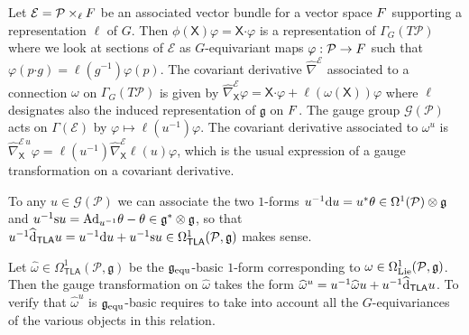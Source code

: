 \documentclass[number]{elsarticle}
\theoremstyle{definition}
\theoremstyle{remark}
\numberwithin{equation}{section}
\begin{document}
Let ${{{{\mathcal{{E}}}}}} = {{{{\mathcal{{P}}}}}} \times_{\ell} {{{{\mathnormal{{F}}}}}}$ be an associated vector bundle for a vector space ${{{{\mathnormal{{F}}}}}}$ supporting a representation $\ell$ of $G$. Then $\phi({{\mathsf X}})\varphi = {{\mathsf X}}{\mathord{\cdot}} \varphi$ is a representation of $\Gamma_G(T{{{{\mathcal{{P}}}}}})$ where we look at sections of ${{{{\mathcal{{E}}}}}}$ as $G$-equivariant maps $\varphi: {{{{\mathcal{{P}}}}}} \rightarrow {{{{\mathnormal{{F}}}}}}$ such that $\varphi(p{\mathord{\cdot}} g) = \ell(g^{-1}) \varphi(p)$. The covariant derivative ${{\widehat{\nabla}}}^{{{{\mathcal{{E}}}}}}$ associated to a connection $\omega$ on $\Gamma_G(T{{{{\mathcal{{P}}}}}})$ is given by ${{\widehat{\nabla}}}^{{{{\mathcal{{E}}}}}}_{{\mathsf X}} \varphi = {{\mathsf X}} {\mathord{\cdot}} \varphi + \ell(\omega({{\mathsf X}})) \varphi$ where $\ell$ designates also the induced representation of ${{\mathfrak g}}$ on ${{{{\mathnormal{{F}}}}}}$. The gauge group ${{\mathcal G}}({{{{\mathcal{{P}}}}}})$ acts on $\Gamma({{{{\mathcal{{E}}}}}})$ by $\varphi \mapsto \ell(u^{-1}) \varphi$. The covariant derivative associated to $\omega^u$ is ${{\widehat{\nabla}}}^{{{{{\mathcal{{E}}}}}}\, u}_{{\mathsf X}} \varphi  = \ell(u^{-1}) {{\widehat{\nabla}}}^{{{{\mathcal{{E}}}}}}_{{\mathsf X}} \ell(u) \varphi$, which is the usual expression of a gauge transformation on a covariant derivative.

To any $u \in {{\mathcal G}}({{{{\mathcal{{P}}}}}})$ we can associate the two $1$-forms $u^{-1} {\text{\textup{d}}} u = u^\ast \theta \in \Omega^1({{{{\mathcal{{P}}}}}})\otimes {{\mathfrak g}}$ and $u^{-1} {\text{\textup{s}}} u = {{\text{\textup{Ad}}}}_{u^{-1}} \theta - \theta \in {{\mathfrak g}}^{\ast} \otimes {{\mathfrak g}}$, so that $u^{-1} {\widehat{\text{\textup{d}}}}_{{{{\mathbf{\mathsf{{TLA}}}}}}} u =  u^{-1}{\text{\textup{d}}} u + u^{-1} {\text{\textup{s}}} u \in \Omega^1_{{{{\mathbf{\mathsf{{TLA}}}}}}}({{{{\mathcal{{P}}}}}},{{\mathfrak g}})$ makes sense.

Let ${\widehat{\omega}} \in \Omega^1_{{{{\mathbf{\mathsf{{TLA}}}}}}}({{{{\mathcal{{P}}}}}},{{\mathfrak g}})$ be the ${{\mathfrak g}}_{{\text{\textup{equ}}}}$-basic $1$-form corresponding to $\omega \in \Omega^1_{{\text{\textup{Lie}}}}({{{{\mathcal{{P}}}}}}, {{\mathfrak g}})$. Then the gauge transformation on ${\widehat{\omega}}$ takes the form ${\widehat{\omega}}^u = u^{-1} {\widehat{\omega}} u + u^{-1} {\widehat{\text{\textup{d}}}}_{{{{\mathbf{\mathsf{{TLA}}}}}}} u$. To verify that ${\widehat{\omega}}^u$ is ${{\mathfrak g}}_{{\text{\textup{equ}}}}$-basic requires to take into account all the $G$-equivariances of the various objects in this relation.
\end{document}
